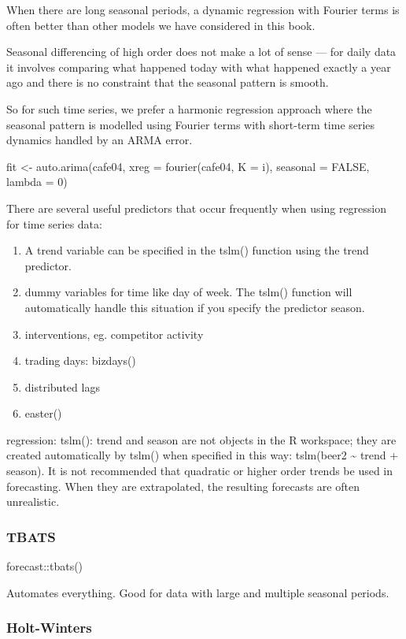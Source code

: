 \documentclass[]{book}
\begin{document}
When there are long seasonal periods, a dynamic regression with Fourier
terms is often better than other models we have considered in this book.

Seasonal differencing of high order does not make a lot of sense --- for
daily data it involves comparing what happened today with what happened
exactly a year ago and there is no constraint that the seasonal pattern
is smooth.

So for such time series, we prefer a harmonic regression approach where
the seasonal pattern is modelled using Fourier terms with short-term
time series dynamics handled by an ARMA error.

fit \textless{}- auto.arima(cafe04, xreg = fourier(cafe04, K = i),
seasonal = FALSE, lambda = 0)

There are several useful predictors that occur frequently when using
regression for time series data:

\begin{enumerate}
\def\labelenumi{\arabic{enumi})}
\item
  A trend variable can be specified in the tslm() function using the
  trend predictor.
\item
  dummy variables for time like day of week. The tslm() function will
  automatically handle this situation if you specify the predictor
  season.
\item
  interventions, eg. competitor activity
\item
  trading days: bizdays()
\item
  distributed lags
\item
  easter()
\end{enumerate}

regression: tslm(): trend and season are not objects in the R workspace;
they are created automatically by tslm() when specified in this way:
tslm(beer2 \textasciitilde{} trend + season). It is not recommended that
quadratic or higher order trends be used in forecasting. When they are
extrapolated, the resulting forecasts are often unrealistic.

\subsubsection{TBATS}\label{tbats}

forecast::tbats()

Automates everything. Good for data with large and multiple seasonal
periods.

\subsubsection{Holt-Winters}\label{holt-winters}
\end{document}
